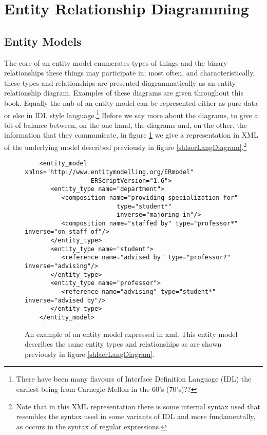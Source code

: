 \section{Entity Relationship Diagramming}
\label{EntityRelationshipDiagramming}

\subsection{Entity Models}

\mynote
The core of an entity model enumerates types of things and the binary relationships these things may participate in; most often, and characteristically, these types and relationships are presented diagrammatically as an entity relationship diagram.
Examples of these diagrams are given  throughout this book.  
Equally the nub of an entity model can be represented either as pure data 
or else in IDL style language.\footnote{There have been many flavours of Interface Definition Language (IDL) the earliest being from Carnegie-Mellon in the 60's (70's)??} 
Before we say more about the diagrams, to give a bit of balance between, on the one hand, the diagrams and,
on the other, the information that they communicate, in figure \ref{shlaerlangModel} we give a representation in XML of the underlying model described previously in figure \ref{shlaerLangDiagram}.\footnote{Note that in this XML representation there is some internal syntax used that resembles the syntax used in some variants of IDL and more fundamentally, as occurs in the syntax of regular expressions.} 

\begin{figure}[h] %
\footnotesize\begin{verbatim}
	<entity_model xmlns="http://www.entitymodelling.org/ERmodel" 
	              ERScriptVersion="1.6">
	   <entity_type name="department">
	      <composition name="providing specialization for"
	                     type="student*"
	                     inverse="majoring in"/>
	      <composition name="staffed by" type="professor*" inverse="on staff of"/>
	   </entity_type>
	   <entity_type name="student">
	      <reference name="advised by" type="professor?" inverse="advising"/>
	   </entity_type>
	   <entity_type name="professor">
	      <reference name="advising" type="student*" inverse="advised by"/>
	   </entity_type>
	</entity_model>\end{verbatim}
\caption{An example of an entity model expressed in xml. 
This entity model describes the same entity types and relationships 
as are shown previously in figure \ref{shlaerLangDiagram}. }
\label{shlaerlangModel}
\end{figure}


